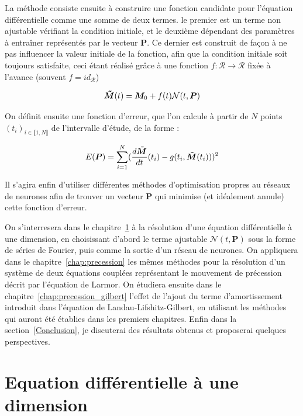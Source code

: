 \documentclass[12pt]{report}
\begin{document}
La méthode consiste ensuite à construire une fonction candidate pour l'équation différentielle comme une somme de deux termes.
le premier est un terme non ajustable vérifiant la condition initiale, et le deuxième dépendant des paramètres à entraîner représentés par le vecteur $\bm{P}$. Ce dernier est construit de façon à ne pas influencer la valeur initiale de la fonction, afin que la condition initiale soit toujours satisfaite, ceci étant réalisé grâce à une fonction $f:\mathcal{R}\to\mathcal{R}$ fixée à l'avance (souvent $f = id_{\mathcal{R}}$)

\begin{equation}
    \bm{\Tilde{M}}(t) = \bm{M}_0 + f(t)\mathcal{N}(t,\bm{P}) 
\label{eq:solution candidate générique}
\end{equation}
    
On définit ensuite une fonction d'erreur, que l'on calcule à partir de $N$ points $(t_i)_{i\in \llbracket 1, N \rrbracket}$ de l'intervalle d'étude, de la forme :

\begin{equation}
    E ({\bm P})= \sum_{i=1}^{N} (\frac{d\bm{\Tilde{M}}}{dt}(t_i) -g(t_i, \bm{\Tilde{M}}(t_i)))^2   
\label{eq:fonction d'erreur générique}
\end{equation}

Il s'agira enfin d'utiliser différentes méthodes d'optimisation propres au réseaux de neurones afin de trouver un vecteur $\bm P$ qui minimise (et idéalement annule) cette fonction d'erreur.

On s'interresera dans le chapitre~\ref{chap:ode_1} à la résolution d'une équation différentielle à une dimension, en choisissant d'abord le terme ajustable $\mathcal{N}(t,\bm{P})$ sous la forme de séries de Fourier, puis comme la sortie d'un réseau de neurones.
On appliquera dans le chapitre~\ref{chap:precession} les mêmes méthodes pour la résolution d'un système de deux équations couplées représentant le mouvement de précession décrit par l'équation de Larmor.
On étudiera ensuite dans le chapitre~\ref{chap:precession_gilbert} l'effet de l'ajout du terme d'amortissement introduit dans l'équation de Landau-Lifshitz-Gilbert, en utilisant les méthodes qui auront été établies dans les premiers chapitres.
Enfin dans la section~\ref{Conclusion}, je discuterai des résultats obtenus et proposerai quelques perspectives.


\chapter{Equation différentielle à une dimension}
\label{chap:ode_1}
\end{document}
